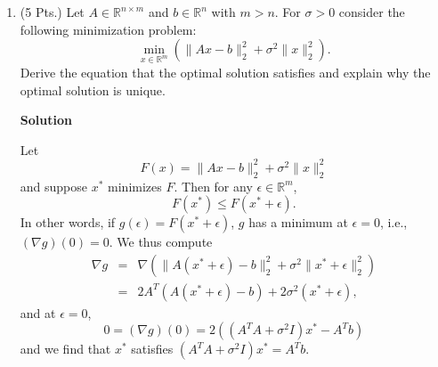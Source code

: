 \documentclass{article}
\begin{document}
\begin{enumerate}
\begin{enumerate}
\item What is the minimal degree polynomial for which the formula with the coefficients derived in (a) is not exact?

\item What is the expected order of a composite integration method based upon the formula with coefficients derived in (a)?

\end{enumerate}

{\bf Solution}

\begin{enumerate}
\item Let \(f(x) = ax^2 + bx + c\).  Then, on the one hand,
\[\int_{-1}^1 f(x) dx
  = \left. \frac{1}{3} ax^3 + \frac{1}{2} bx^2 + cx \right|_{-1}^1
  = \frac{2}{3} a + 2c,\]
and on the other hand,
\[\beta \left( f(\alpha_1) + f(\alpha_2) \right)
  = \beta (\alpha_1^2 + \alpha_2^2) a
  + \beta (\alpha_1 + \alpha_2) b
  + 2 \beta c.\]
Equating coefficients on the above two expression, we find that \(\alpha_1 = -\alpha_2 = \frac{1}{\sqrt{3}}\) and \(\beta = 1\).

\item \(3\)

\item Given that we wish to integrate \(f\) over \([-h,h]\), we would approximate \(f\) by a quadratic \(q\) to \(O(h^3)\) over \([-h,h]\).  The integral over \([-h,h]\) of \(f\) could then be approximated by the integral of \(q\) over \([-h,h]\) to \(O(h^4)\).  The composite integration scheme would then be accurate to \(O(h^3)\).

\end{enumerate}



\item (5 Pts.) Let \(A \in \mathbb{R}^{n \times m}\) and \(b \in \mathbb{R}^n\) with \(m > n\).  For \(\sigma > 0\) consider the following minimization problem:
\[\min_{x \in \mathbb{R}^m} \left( \|Ax - b\|_2^2 + \sigma^2 \|x\|_2^2 \right).\]
Derive the equation that the optimal solution satisfies and explain why the optimal solution is unique.

{\bf Solution}

Let
\[F(x) = \|Ax - b\|_2^2 + \sigma^2 \|x\|_2^2\]
and suppose \(x^*\) minimizes \(F\).  Then for any \(\epsilon \in \mathbb{R}^m\),
\[F(x^*) \leq F(x^* + \epsilon).\]
In other words, if \(g(\epsilon) = F(x^* + \epsilon)\), \(g\) has a minimum at \(\epsilon = 0\), i.e., \((\nabla g)(0) = 0\).  We thus compute
\begin{eqnarray*}
\nabla g & = & \nabla \left( \|A(x^* + \epsilon) - b\|_2^2 + \sigma^2 \|x^* + \epsilon\|_2^2 \right) \\
         & = & 2 A^T (A(x^* + \epsilon) - b) + 2 \sigma^2 (x^* + \epsilon),
\end{eqnarray*}
and at \(\epsilon = 0\),
\[0 = (\nabla g)(0) = 2 \left( (A^T A + \sigma^2 I) x^* - A^T b \right)\]
and we find that \(x^*\) satisfies \((A^T A + \sigma^2 I) x^* = A^T b\).


\end{enumerate}
\end{document}
